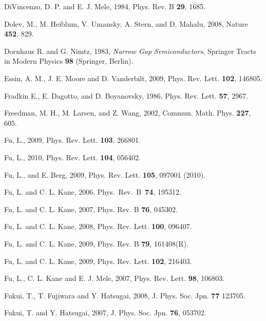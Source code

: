 \documentclass[twocolumn,floatfix,showpacs,rmp,aps]{revtex4}
\begin{document}
\begin{thebibliography}{99}
DiVincenzo, D. P. and E. J. Mele, 1984,
Phys. Rev. B {\bf 29}, 1685.

Dolev, M., M. Heiblum, V. Umansky, A. Stern, and D. Mahalu, 2008,
Nature {\bf 452}, 829.

Dornhaus R. and G. Nimtz, 1983,
{\it Narrow Gap Semiconductors},
Springer Tracts in Modern Physics {\bf 98} (Springer, Berlin).

Essin, A. M., J. E. Moore and D. Vanderbilt, 2009,
Phys. Rev. Lett. {\bf 102}, 146805.

Fradkin E., E. Dagotto, and D. Boyanovsky, 1986, Phys. Rev.
Lett. {\bf 57}, 2967.

Freedman, M. H., M. Larsen, and Z. Wang, 2002,
Commun. Math. Phys. {\bf 227}, 605.

Fu, L., 2009,
Phys. Rev. Lett. {\bf 103}, 266801.

Fu, L., 2010,
Phys. Rev. Lett. {\bf 104}, 056402.

Fu, L., and E. Berg, 2009,
Phys. Rev. Lett. {\bf 105}, 097001 (2010).

Fu, L. and C. L. Kane, 2006,
Phys.\ Rev.\ B\ {\bf 74}, 195312.

Fu, L. and C. L. Kane, 2007,
Phys. Rev. B {\bf 76}, 045302.

Fu, L. and C. L. Kane, 2008,
Phys. Rev. Lett. {\bf 100}, 096407.

Fu, L. and C. L. Kane, 2009,
Phys. Rev. B {\bf 79}, 161408(R).

Fu, L. and C. L. Kane, 2009,
Phys. Rev. Lett. {\bf 102}, 216403.

Fu, L., C. L. Kane and E. J. Mele, 2007,
Phys. Rev. Lett. {\bf 98}, 106803.

Fukui, T., T. Fujiwara and Y. Hatsugai, 2008,
J. Phys. Soc. Jpn. {\bf 77} 123705.

Fukui, T. and Y. Hatsugai, 2007,
J. Phys. Soc. Jpn. {\bf 76}, 053702.


\end{thebibliography}
\end{document}
